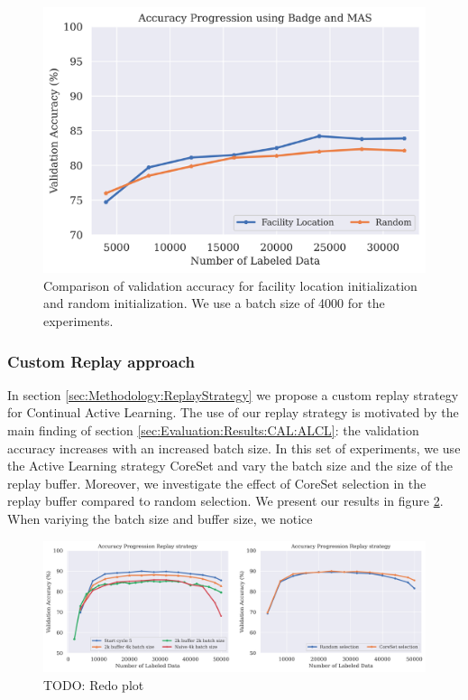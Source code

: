 \begin{figure}[h]
    \centering
    \includegraphics[width=\linewidth]{images/results_CAL/Factility_location_init.png}
    \caption[Initialization using Facility Location]{Comparison of validation accuracy for facility location initialization and random initialization. We use a batch size of 4000 for the experiments.}
    \label{fig:Evaluation:Results:CAL:FLinit}
\end{figure}


\subsubsection{Custom Replay approach}
\label{sec:Evaluation:Results:CAL:Replay}
In section \ref{sec:Methodology:ReplayStrategy} we propose a custom replay strategy for Continual Active Learning. The use of our replay strategy is motivated by the main finding of section \ref{sec:Evaluation:Results:CAL:ALCL}: the validation accuracy increases with an
increased batch size. In this set of experiments, we use the Active Learning strategy CoreSet and vary the batch size and the size of the replay buffer. Moreover, we investigate the effect of CoreSet selection in the replay buffer compared to random selection. We present our
results in figure \ref{fig:Evaluation:Results:CAL:Replay}. When variying the batch size and buffer size,  we notice 

\begin{figure}[h]
    \centering
    \includegraphics[width=\linewidth]{images/results_CAL/replay_CAL.png}
    \caption[Continual Active Learning Custom Replay strategy]{TODO: Redo plot}
    \label{fig:Evaluation:Results:CAL:Replay}
\end{figure}

